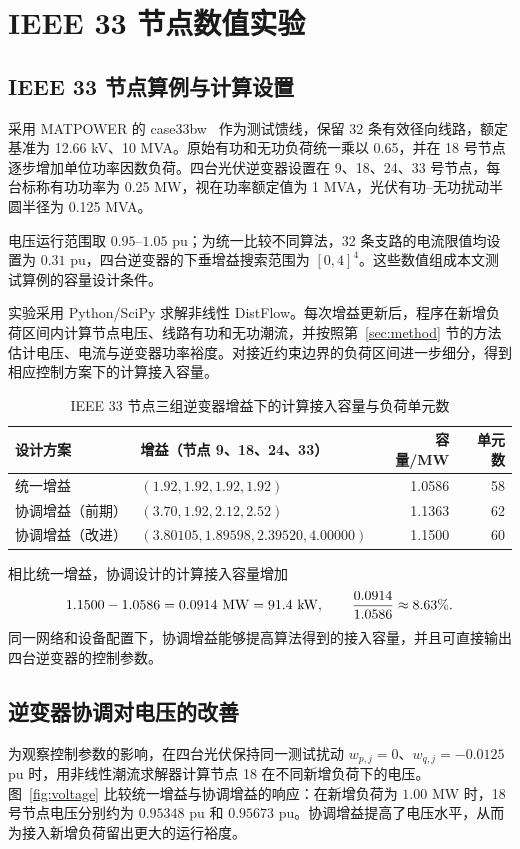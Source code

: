 \section{IEEE 33 节点数值实验}\label{sec:experiments}
\subsection{IEEE 33 节点算例与计算设置}
采用 MATPOWER 的 case33bw~\cite{matpower33} 作为测试馈线，保留 32 条有效径向线路，额定基准为 12.66 kV、10 MVA。原始有功和无功负荷统一乘以 0.65，并在 18 号节点逐步增加单位功率因数负荷。四台光伏逆变器设置在 9、18、24、33 号节点，每台标称有功功率为 0.25 MW，视在功率额定值为 1 MVA，光伏有功--无功扰动半圆半径为 0.125 MVA。

电压运行范围取 $0.95$--$1.05$ pu；为统一比较不同算法，32 条支路的电流限值均设置为 $0.31$ pu，四台逆变器的下垂增益搜索范围为 $[0,4]^4$。这些数值组成本文测试算例的容量设计条件。

实验采用 Python/SciPy 求解非线性 DistFlow。每次增益更新后，程序在新增负荷区间内计算节点电压、线路有功和无功潮流，并按照第~\ref{sec:method} 节的方法估计电压、电流与逆变器功率裕度。对接近约束边界的负荷区间进一步细分，得到相应控制方案下的计算接入容量。



\begin{table}[ht]
\centering
\caption{IEEE 33 节点三组逆变器增益下的计算接入容量与负荷单元数}
\label{tab:results}
\begin{tabular}{@{}p{32mm}p{72mm}rr@{}}
\toprule
设计方案 & 增益（节点 9、18、24、33） & 容量/MW & 单元数\\
\midrule
统一增益 & $(1.92,1.92,1.92,1.92)$ & 1.0586 & 58\\
协调增益（前期） & $(3.70,1.92,2.12,2.52)$ & 1.1363 & 62\\
协调增益（改进） & $(3.80105,1.89598,2.39520,4.00000)$ & 1.1500 & 60\\
\bottomrule
\end{tabular}
\end{table}

相比统一增益，协调设计的计算接入容量增加
\[
1.1500-1.0586=0.0914\ {\rm MW}=91.4\ {\rm kW},
\qquad \frac{0.0914}{1.0586}\approx8.63\%.
\]
同一网络和设备配置下，协调增益能够提高算法得到的接入容量，并且可直接输出四台逆变器的控制参数。

\subsection{逆变器协调对电压的改善}
为观察控制参数的影响，在四台光伏保持同一测试扰动 $w_{p,j}=0$、$w_{q,j}=-0.0125$ pu 时，用非线性潮流求解器计算节点 18 在不同新增负荷下的电压。图~\ref{fig:voltage} 比较统一增益与协调增益的响应：在新增负荷为 $1.00$ MW 时，18 号节点电压分别约为 $0.95348$ pu 和 $0.95673$ pu。协调增益提高了电压水平，从而为接入新增负荷留出更大的运行裕度。

